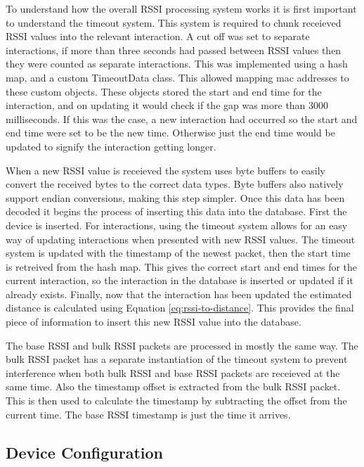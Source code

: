 \documentclass{l4proj}
\begin{document}
To understand how the overall RSSI processing system works it is first important to understand the timeout system. This system is required to chunk receieved RSSI values into the relevant interaction. A cut off was set to separate interactions, if more than three seconds had passed between RSSI values then they were counted as separate interactions. This was implemented using a hash map, and a custom TimeoutData class. This allowed mapping mac addresses to these custom objects. These objects stored the start and end time for the interaction, and on updating it would check if the gap was more than 3000 milliseconds. If this was the case, a new interaction had occurred so the start and end time were set to be the new time. Otherwise just the end time would be updated to signify the interaction getting longer.

When a new RSSI value is receieved the system uses byte buffers to easily convert the received bytes to the correct data types. Byte buffers also natively support endian conversions, making this step simpler. Once this data has been decoded it begins the process of inserting this data into the database. First the device is inserted. For interactions, using the timeout system allows for an easy way of updating interactions when presented with new RSSI values. The timeout system is updated with the timestamp of the newest packet, then the start time is retreived from the hash map. This gives the correct start and end times for the current interaction, so the interaction in the database is inserted or updated if it already exists. Finally, now that the interaction has been updated the estimated distance is calculated using Equation \ref{eq:rssi-to-distance}. This provides the final piece of information to insert this new RSSI value into the database.

The base RSSI and bulk RSSI packets are processed in mostly the same way. The bulk RSSI packet has a separate instantiation of the timeout system to prevent interference when both bulk RSSI and base RSSI packets are receieved at the same time. Also the timestamp offset is extracted from the bulk RSSI packet. This is then used to calculate the timestamp by subtracting the offset from the current time. The base RSSI timestamp is just the time it arrives.

\subsection{Device Configuration}
\end{document}
